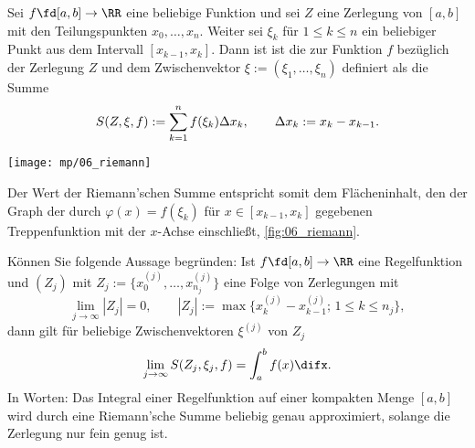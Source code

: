 \begin{antwort}
Sei $f\fd [a,b]\to\RR$ eine beliebige Funktion und 
sei $Z$ eine Zerlegung von $[a,b]$ mit den Teilungspunkten 
$x_0, \ldots , x_n$. 
Weiter sei $\xi_k$ für $1\le k \le n$ ein beliebiger Punkt aus dem 
Intervall $[x_{k-1},x_k]$. 
Dann ist ist die  zur Funktion 
$f$ bezüglich der Zerlegung $Z$ und dem Zwischenvektor 
$\xi:= (\xi_1,\ldots,\xi_n)$ definiert als die Summe 
\begin{equation}
S(Z,\xi,f):=\sum_{k=1}^n f(\xi_k) \Delta x_k, \qquad 
\Delta x_k := x_k-x_{k-1}.
\notag
\end{equation}

\begin{center}
  \texttt{[image: mp/06\_riemann]}
  \label{fig:06_riemann}
\end{center}

Der Wert der Riemann'schen Summe entspricht somit dem Flächeninhalt, den 
der Graph der durch $\varphi(x)=f(\xi_k)$ für $x\in[x_{k-1},x_k]$ gegebenen  
Treppenfunktion mit der $x$-Achse einschließt, \sieheAbbildung\ref{fig:06_riemann}. 
\AntEnd
\end{antwort}

\begin{frage}\label{riemannsumme}
Können Sie folgende Aussage begründen: Ist $f\fd [a,b]\to \RR$ eine 
Regelfunktion und $(Z_j)$ mit 
$Z_j := \{ x_0^{(j)}, \ldots, x_{n_j}^{(j)} \}$ eine Folge 
von Zerlegungen mit 
\[
\lim_{j\to \infty} |Z_j| = 0, \qquad 
|Z_j| := \max\{ x_k^{(j)} - x_{k-1}^{(j)};\, 1\le k \le n_j \},
\]
dann gilt für beliebige Zwischenvektoren $\xi^{(j)}$ von $Z_j$ 
\[
\lim_{j\to\infty} S( Z_j, \xi_j, f ) = \int_a^b f(x) \difx.
\]
In Worten: Das Integral einer Regelfunktion auf einer 
kompakten Menge $[a,b]$ wird durch eine Riemann'sche Summe 
beliebig genau approximiert, solange die Zerlegung nur 
fein genug ist.
\end{frage}

